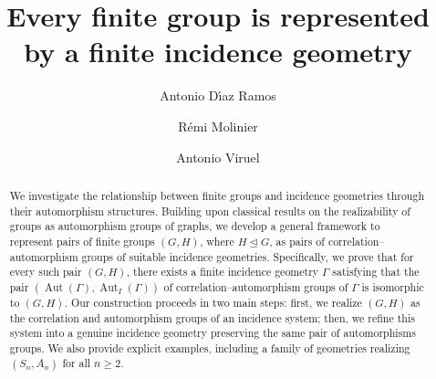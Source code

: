 \documentclass{amsart}
\theoremstyle{definition}
\theoremstyle{remark}
\begin{document}
\title[Finite groups represented by finite incidence geometries]{Every finite group is represented by a finite incidence geometry}
\author{Antonio D{\'\i}az Ramos}
\address{Departamento de \'Algebra, Geometr{\'\i}a y Topolog{\'\i}a, Universidad de M{\'a}laga, 29071-M{\'a}laga, Spain}
\author{R\'emi Molinier}
\address{Institut Fourier, UMR 5582, Laboratoire de Mathématiques, Université Grenoble Alpes, CS 40700, 38058 Grenoble cedex 9, France}
\author{Antonio Viruel}
\address{Departamento de \'Algebra, Geometr{\'\i}a y Topolog{\'\i}a, Universidad de M{\'a}laga, 29071-M{\'a}laga, Spain}





\begin{abstract}
We investigate the relationship between finite groups and incidence geometries through their automorphism structures. Building upon classical results on the realizability of groups as automorphism groups of graphs, we develop a general framework to represent pairs of finite groups $(G, H)$, where $H \trianglelefteq G$, as pairs of correlation--automorphism groups of suitable incidence geometries. Specifically, we prove that for every such pair $(G, H)$, there exists a finite incidence geometry $\Gamma$ satisfying that the pair  $(\operatorname{Aut}(\Gamma), \operatorname{Aut}_I(\Gamma))$  of correlation--automorphism groups of $\Gamma$ is isomorphic to $(G, H)$. Our construction proceeds in two main steps: first, we realize $(G, H)$ as the correlation and automorphism groups of an incidence system; then, we refine this system into a genuine incidence geometry preserving the same pair of automorphisms groups. We also provide explicit examples, including a family of geometries realizing $(S_n, A_n)$ for all $n \ge 2$.
\end{abstract}
\end{document}
